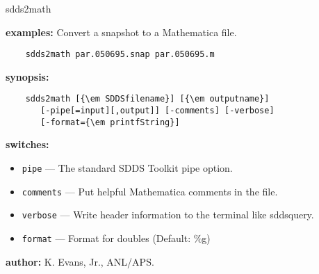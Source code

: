 \begin{sddsprog}{sdds2math}
  \item \textbf{examples:}
    Convert a snapshot to a Mathematica file.
    \begin{verbatim}
    sdds2math par.050695.snap par.050695.m
    \end{verbatim}

  \item \textbf{synopsis:}
    \begin{verbatim}
    sdds2math [{\em SDDSfilename}] [{\em outputname}]
       [-pipe[=input][,output]] [-comments] [-verbose]
       [-format={\em printfString}]
    \end{verbatim}

  \item \textbf{switches:}
    \begin{itemize}
      \item \verb|pipe| --- The standard SDDS Toolkit pipe option.
      \item \verb|comments| --- Put helpful Mathematica comments in the file.
      \item \verb|verbose| --- Write header information to the terminal like sddsquery.
      \item \verb|format| --- Format for doubles (Default: \%g)
    \end{itemize}
  \item \textbf{author:} K. Evans, Jr., ANL/APS.
\end{sddsprog}
 
